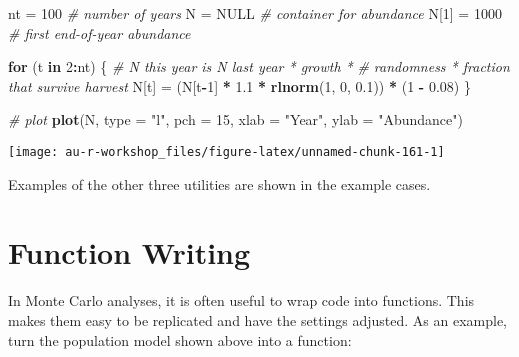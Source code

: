 \documentclass[]{book}
\newenvironment{Shaded}{\begin{snugshade}}{\end{snugshade}}
\newcommand{\KeywordTok}[1]{\textcolor[rgb]{0.13,0.29,0.53}{\textbf{#1}}}
\newcommand{\DataTypeTok}[1]{\textcolor[rgb]{0.13,0.29,0.53}{#1}}
\newcommand{\DecValTok}[1]{\textcolor[rgb]{0.00,0.00,0.81}{#1}}
\newcommand{\FloatTok}[1]{\textcolor[rgb]{0.00,0.00,0.81}{#1}}
\newcommand{\StringTok}[1]{\textcolor[rgb]{0.31,0.60,0.02}{#1}}
\newcommand{\CommentTok}[1]{\textcolor[rgb]{0.56,0.35,0.01}{\textit{#1}}}
\newcommand{\OtherTok}[1]{\textcolor[rgb]{0.56,0.35,0.01}{#1}}
\newcommand{\ControlFlowTok}[1]{\textcolor[rgb]{0.13,0.29,0.53}{\textbf{#1}}}
\newcommand{\OperatorTok}[1]{\textcolor[rgb]{0.81,0.36,0.00}{\textbf{#1}}}
\newcommand{\NormalTok}[1]{#1}
\theoremstyle{definition}
\theoremstyle{definition}
\theoremstyle{definition}
\theoremstyle{remark}
\begin{document}
\begin{Shaded}
\begin{Highlighting}[]
\NormalTok{nt =}\StringTok{ }\DecValTok{100}       \CommentTok{# number of years}
\NormalTok{N =}\StringTok{ }\OtherTok{NULL}       \CommentTok{# container for abundance}
\NormalTok{N[}\DecValTok{1}\NormalTok{] =}\StringTok{ }\DecValTok{1000}    \CommentTok{# first end-of-year abundance}

\ControlFlowTok{for}\NormalTok{ (t }\ControlFlowTok{in} \DecValTok{2}\OperatorTok{:}\NormalTok{nt) \{}
  \CommentTok{# N this year is N last year * growth *}
    \CommentTok{# randomness * fraction that survive harvest}
\NormalTok{  N[t] =}\StringTok{ }\NormalTok{(N[t}\OperatorTok{-}\DecValTok{1}\NormalTok{] }\OperatorTok{*}\StringTok{ }\FloatTok{1.1} \OperatorTok{*}\StringTok{ }\KeywordTok{rlnorm}\NormalTok{(}\DecValTok{1}\NormalTok{, }\DecValTok{0}\NormalTok{, }\FloatTok{0.1}\NormalTok{)) }\OperatorTok{*}\StringTok{ }\NormalTok{(}\DecValTok{1} \OperatorTok{-}\StringTok{ }\FloatTok{0.08}\NormalTok{)}
\NormalTok{\}}

\CommentTok{# plot}
\KeywordTok{plot}\NormalTok{(N, }\DataTypeTok{type =} \StringTok{"l"}\NormalTok{, }\DataTypeTok{pch =} \DecValTok{15}\NormalTok{, }\DataTypeTok{xlab =} \StringTok{"Year"}\NormalTok{, }\DataTypeTok{ylab =} \StringTok{"Abundance"}\NormalTok{)}
\end{Highlighting}
\end{Shaded}

\begin{center}\texttt{[image: au-r-workshop\_files/figure-latex/unnamed-chunk-161-1]} \end{center}

Examples of the other three utilities are shown in the example cases.

\section{Function Writing}\label{adv-funcs}

In Monte Carlo analyses, it is often useful to wrap code into functions.
This makes them easy to be replicated and have the settings adjusted. As
an example, turn the population model shown above into a function:
\end{document}
